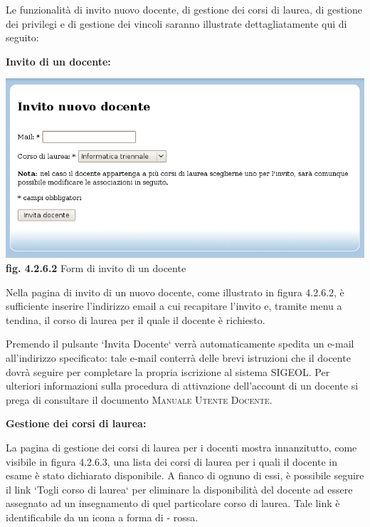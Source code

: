 \documentclass[11pt,a4paper]{article}
\begin{document}
Le funzionalità di invito nuovo docente, di gestione dei corsi di laurea, di gestione dei privilegi e di gestione dei vincoli saranno illustrate dettagliatamente qui di seguito:
\newline \newline
\begin{large}\textbf{Invito di un docente:}\end{large}

\bigskip
\begin{center}
	\includegraphics[scale=0.5]{images/invito_docenti.jpg}\\
	\textbf{fig. 4.2.6.2} Form di invito di un docente\\
\end{center}
\bigskip

Nella pagina di invito di un nuovo docente, come illustrato in figura 4.2.6.2, è sufficiente inserire l'indirizzo email a cui recapitare l'invito e, tramite menu a tendina, il corso di laurea per il quale il docente è richiesto.

Premendo il pulsante `Invita Docente` verrà automaticamente spedita un e-mail all'indirizzo specificato: tale e-mail conterrà delle brevi istruzioni che il docente dovrà seguire per completare la propria iscrizione al sistema SIGEOL.
Per ulteriori informazioni sulla procedura di attivazione dell'account di un docente si prega di consultare il documento \textsc{Manuale Utente Docente}.
\newline \newline
\begin{large}\textbf{Gestione dei corsi di laurea:}\end{large}
\newline \newline
La pagina di gestione dei corsi di laurea per i docenti mostra innanzitutto, come visibile in figura 4.2.6.3, una lista dei corsi di laurea per i quali il docente in esame è stato dichiarato disponibile. A fianco di ognuno di essi, è possibile seguire il link `Togli corso di laurea` per eliminare la disponibilità del docente ad essere assegnato ad un insegnamento di quel particolare corso di laurea. Tale link è identificabile da un icona a forma di - rossa.
\end{document}
